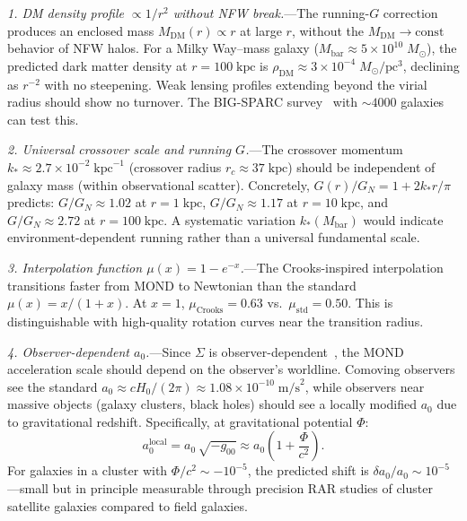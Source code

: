 \documentclass[prd,twocolumn,superscriptaddress,longbibliography,floatfix]{revtex4-2}
\newcommand{\Msun}{M_\odot}
\begin{document}
\emph{1. DM density profile $\propto 1/r^2$ without NFW
break.}---The running-$G$ correction produces an enclosed mass
$M_{\mathrm{DM}}(r) \propto r$ at large $r$, without the
$M_{\mathrm{DM}} \to \mathrm{const}$ behavior of NFW halos.
For a Milky Way--mass galaxy ($M_{\mathrm{bar}} \approx
5 \times 10^{10}\;\Msun$), the predicted dark matter density
at $r = 100\;\mathrm{kpc}$ is
$\rho_{\mathrm{DM}} \approx 3 \times 10^{-4}\;\Msun/
\mathrm{pc}^3$, declining as $r^{-2}$ with no steepening.
Weak lensing profiles extending beyond the virial radius should
show no turnover.  The BIG-SPARC
survey~\cite{Haubner2024} with $\sim\!4000$ galaxies can test
this.

\emph{2. Universal crossover scale and running $G$.}---The
crossover momentum
$k_* \approx 2.7 \times 10^{-2}\;\mathrm{kpc}^{-1}$
(crossover radius $r_c \approx 37\;\mathrm{kpc}$) should be
independent of galaxy mass (within observational scatter).
Concretely, $G(r)/G_N = 1 + 2k_* r/\pi$ predicts:
$G/G_N \approx 1.02$ at $r = 1\;\mathrm{kpc}$,
$G/G_N \approx 1.17$ at $r = 10\;\mathrm{kpc}$, and
$G/G_N \approx 2.72$ at $r = 100\;\mathrm{kpc}$.
A systematic variation $k_*(M_{\mathrm{bar}})$ would indicate
environment-dependent running rather than a universal
fundamental scale.

\emph{3. Interpolation function $\mu(x) = 1 - e^{-x}$.}---The
Crooks-inspired interpolation transitions faster from MOND to
Newtonian than the standard $\mu(x) = x/(1+x)$.  At
$x = 1$, $\mu_{\mathrm{Crooks}} = 0.63$ vs.\
$\mu_{\mathrm{std}} = 0.50$.  This is distinguishable with
high-quality rotation curves near the transition radius.

\emph{4. Observer-dependent $a_0$.}---Since
$\Sigma$ is observer-dependent~\cite{BassoCeleri2025}, the
MOND acceleration scale should depend on the observer's
worldline.  Comoving observers see the standard
$a_0 \approx cH_0/(2\pi) \approx 1.08 \times 10^{-10}\;
\mathrm{m/s}^2$, while observers near massive
objects (galaxy clusters, black holes) should see a locally
modified $a_0$ due to gravitational redshift.  Specifically,
at gravitational potential $\Phi$:
\begin{equation}
a_0^{\mathrm{local}} = a_0\,\sqrt{-g_{00}}
\approx a_0\left(1 + \frac{\Phi}{c^2}\right).
\label{eq:a0_local}
\end{equation}
For galaxies in a cluster with $\Phi/c^2 \sim -10^{-5}$,
the predicted shift is
$\delta a_0/a_0 \sim 10^{-5}$---small but in principle
measurable through precision RAR studies of cluster satellite
galaxies compared to field galaxies.
\end{document}
